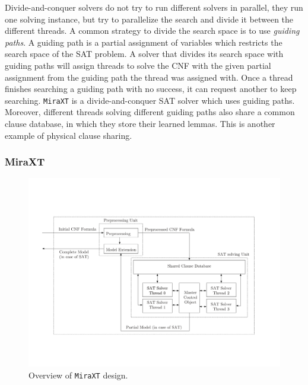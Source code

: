 \documentclass[12pt]{diicc}
\begin{document}
Divide-and-conquer solvers do not try to run different solvers in parallel, they run one solving instance, but try to parallelize the search and divide it between the different threads. A common strategy to divide the search space is to use \textit{guiding paths}. A guiding path is a partial assignment of variables which restricts the search space of the SAT problem. A solver that divides its search space with guiding paths will assign threads to solve the CNF with the given partial assignment from the guiding path the thread was assigned with. Once a thread finishes searching a guiding path with no success, it can request another to keep searching. \texttt{MiraXT} \cite{miraxt} is a divide-and-conquer SAT solver which uses guiding paths. Moreover, different threads solving different guiding paths also share a common clause database, in which they store their learned lemmas. This is another example of physical clause sharing. 

\subsubsection{MiraXT}

\begin{figure}[h!]
	\centering
		\includegraphics[width=\textwidth]{miraxtdesign}
	\caption{Overview of \texttt{MiraXT} design.}
	\label{fig:miraxt overview}
\end{figure}
\end{document}
